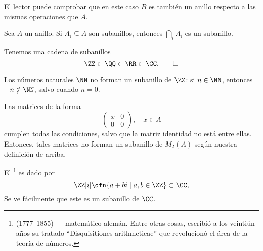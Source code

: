 El lector puede comprobar que en este caso $B$ es también un anillo respecto
a las mismas operaciones que $A$.

\begin{observacionejerc}
  Sea $A$ un anillo. Si $A_i \subseteq A$ son subanillos, entonces
  $\bigcap_i A_i$ es un subanillo.
\end{observacionejerc}

\begin{ejemplo}
  Tenemos una cadena de subanillos
  \[ \ZZ \subset \QQ \subset \RR \subset \CC. \qedhere \]
\end{ejemplo}

\begin{ejemplo}
  Los números naturales $\NN$ no forman un subanillo de $\ZZ$: si $n \in \NN$,
  entonces $-n \notin \NN$, salvo cuando $n = 0$.
\end{ejemplo}

\begin{ejemplo}
  Las matrices de la forma
  \[ \begin{pmatrix}
      x & 0 \\
      0 & 0
    \end{pmatrix}, \quad x\in A \]
  cumplen todas las condiciones, salvo que la matriz identidad no está entre
  ellas. Entonces, tales matrices no forman un subanillo de $M_2 (A)$ según
  nuestra definición de arriba.
\end{ejemplo}

\begin{ejemplo}
  El \footnote{ (1777--1855) --- matemático alemán. Entre otras cosas, escribió a
    los veintiún años su tratado ``Disquisitiones arithmeticae'' que revolucionó
    el área de la teoría de números.}  es dado por
  $$\ZZ [i] \dfn \{ a + bi \mid a,b \in \ZZ \} \subset \CC,$$
  Se ve fácilmente que este es un subanillo de $\CC$.
\end{ejemplo}


